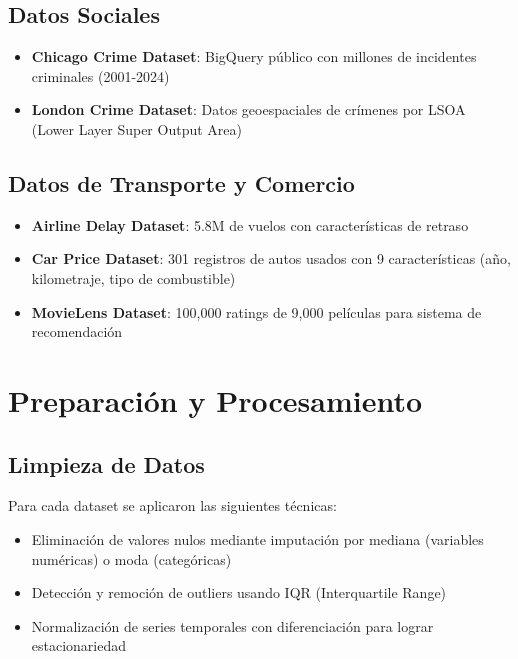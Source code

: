 \subsection{Datos Sociales}

\begin{itemize}
    \item \textbf{Chicago Crime Dataset}: BigQuery público con millones de incidentes criminales (2001-2024)
    \item \textbf{London Crime Dataset}: Datos geoespaciales de crímenes por LSOA (Lower Layer Super Output Area)
\end{itemize}

\subsection{Datos de Transporte y Comercio}

\begin{itemize}
    \item \textbf{Airline Delay Dataset}: 5.8M de vuelos con características de retraso
    \item \textbf{Car Price Dataset}: 301 registros de autos usados con 9 características (año, kilometraje, tipo de combustible)
    \item \textbf{MovieLens Dataset}: 100,000 ratings de 9,000 películas para sistema de recomendación
\end{itemize}

\section{Preparación y Procesamiento}

\subsection{Limpieza de Datos}

Para cada dataset se aplicaron las siguientes técnicas:
\begin{itemize}
    \item Eliminación de valores nulos mediante imputación por mediana (variables numéricas) o moda (categóricas)
    \item Detección y remoción de outliers usando IQR (Interquartile Range)
    \item Normalización de series temporales con diferenciación para lograr estacionariedad
\end{itemize}

